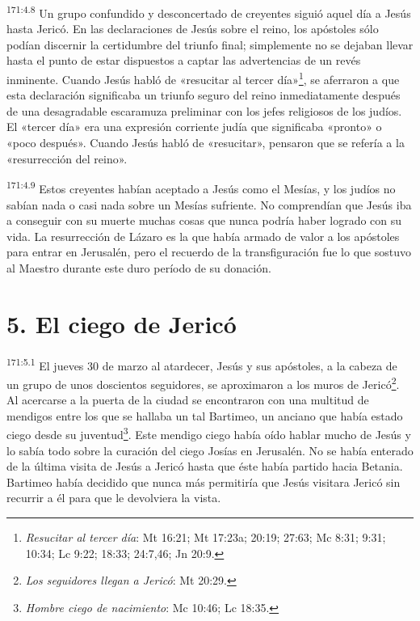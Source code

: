 \par 
\textsuperscript{171:4.8} Un grupo confundido y desconcertado de creyentes siguió aquel día a Jesús hasta Jericó. En las declaraciones de Jesús sobre el reino, los apóstoles sólo podían discernir la certidumbre del triunfo final; simplemente no se dejaban llevar hasta el punto de estar dispuestos a captar las advertencias de un revés inminente. Cuando Jesús habló de «resucitar al tercer día»\footnote{\textit{Resucitar al tercer día}: Mt 16:21; Mt 17:23a; 20:19; 27:63; Mc 8:31; 9:31; 10:34; Lc 9:22; 18:33; 24:7,46; Jn 20:9.}, se aferraron a que esta declaración significaba un triunfo seguro del reino inmediatamente después de una desagradable escaramuza preliminar con los jefes religiosos de los judíos. El «tercer día» era una expresión corriente judía que significaba «pronto» o «poco después». Cuando Jesús habló de «resucitar», pensaron que se refería a la «resurrección del reino».

\par 
\textsuperscript{171:4.9} Estos creyentes habían aceptado a Jesús como el Mesías, y los judíos no sabían nada o casi nada sobre un Mesías sufriente. No comprendían que Jesús iba a conseguir con su muerte muchas cosas que nunca podría haber logrado con su vida. La resurrección de Lázaro es la que había armado de valor a los apóstoles para entrar en Jerusalén, pero el recuerdo de la transfiguración fue lo que sostuvo al Maestro durante este duro período de su donación.

\section*{5. El ciego de Jericó}
\par 
\textsuperscript{171:5.1} El jueves 30 de marzo al atardecer, Jesús y sus apóstoles, a la cabeza de un grupo de unos doscientos seguidores, se aproximaron a los muros de Jericó\footnote{\textit{Los seguidores llegan a Jericó}: Mt 20:29.}. Al acercarse a la puerta de la ciudad se encontraron con una multitud de mendigos entre los que se hallaba un tal Bartimeo, un anciano que había estado ciego desde su juventud\footnote{\textit{Hombre ciego de nacimiento}: Mc 10:46; Lc 18:35.}. Este mendigo ciego había oído hablar mucho de Jesús y lo sabía todo sobre la curación del ciego Josías en Jerusalén. No se había enterado de la última visita de Jesús a Jericó hasta que éste había partido hacia Betania. Bartimeo había decidido que nunca más permitiría que Jesús visitara Jericó sin recurrir a él para que le devolviera la vista.

